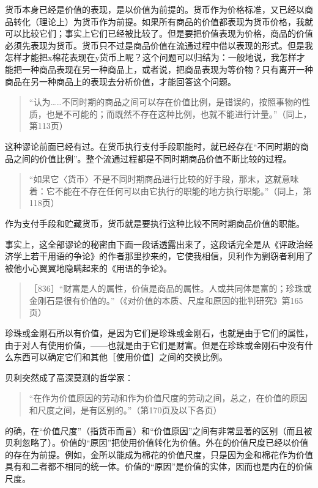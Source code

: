 货币本身已经是价值的表现，是以价值为前提的。货币作为价格标准，又已经以商品转化（理论上）为货币作为前提。如果所有商品的价值都表现为货币价格，我就可以比较它们；事实上它们已经被比较了。但是要把价值表现为价格，商品的价值必须先表现为货币。货币只不过是商品价值在流通过程中借以表现的形式。但是我怎样才能把x棉花表现在y货币上呢？这个问题可以归结为：一般地说，我怎样才能把一种商品表现在另一种商品上，或者说，把商品表现为等价物？只有离开一种商品在另一种商品上的表现去分析价值，才能回答这个问题。

\begin{quote}{“认为……不同时期的商品之间可以存在价值比例，是错误的，按照事物的性质，也是不可能的；而既然不存在这种比例，也就不能进行计量。”（同上，第113页）}\end{quote}

这种谬论前面已经有过。在货币执行支付手段职能时，就已经存在“不同时期的商品之间的价值比例”。整个流通过程都是不同时期商品价值不断比较的过程。

\begin{quote}{“如果它〈货币〉不是不同时期商品进行比较的好手段，那末，这就意味着：它不能在不存在任何可以由它执行的职能的地方执行职能。”（同上，第118页）}\end{quote}

作为支付手段和贮藏货币，货币就是要执行这种比较不同时期商品价值的职能。

事实上，这全部谬论的秘密由下面一段话透露出来了，这段话完全是从《评政治经济学上若干用语的争论》的作者那里抄来的，它使我相信，贝利作为剽窃者利用了被他小心翼翼地隐瞒起来的《用语的争论》。

\begin{quote}{［836］“财富是人的属性，价值是商品的属性。人或共同体是富的；珍珠或金刚石是很有价值的。”（《对价值的本质、尺度和原因的批判研究》第165页）}\end{quote}

珍珠或金刚石所以有价值，是因为它们是珍珠或金刚石，也就是由于它们的属性，由于对人有使用价值，——也就是由于它们是财富。但是在珍珠或金刚石中没有什么东西可以确定它们和其他［使用价值］之间的交换比例。

贝利突然成了高深莫测的哲学家：

\begin{quote}{“在作为价值原因的劳动和作为价值尺度的劳动之间，总之，在价值的原因和尺度之间，是有区别的。”（第170页及以下各页）}\end{quote}

的确，在“价值尺度”（指货币而言）和“价值原因”之间有非常显著的区别（而且被贝利忽略了）。价值的“原因”把使用价值转化为价值。外在的价值尺度已经以价值的存在为前提。例如，金所以能成为棉花的价值尺度，只是因为金和棉花作为价值具有和二者都不相同的统一体。价值的“原因”是价值的实体，因而也是内在的价值尺度。

